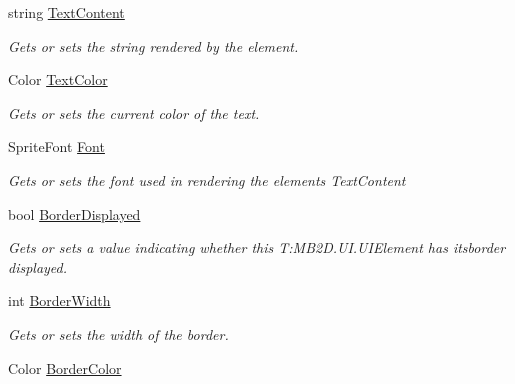 \begin{DoxyCompactItemize}
string \hyperlink{class_m_b2_d_1_1_u_i_1_1_u_i_element_abddab0c939c89a0be403b577d4428309}{Text\+Content}
\begin{DoxyCompactList}\small\item\em Gets or sets the string rendered by the element. \end{DoxyCompactList}\item 
Color \hyperlink{class_m_b2_d_1_1_u_i_1_1_u_i_element_aaf5bdcd4524ae5e93f1c40431d7d6c90}{Text\+Color}
\begin{DoxyCompactList}\small\item\em Gets or sets the current color of the text. \end{DoxyCompactList}\item 
Sprite\+Font \hyperlink{class_m_b2_d_1_1_u_i_1_1_u_i_element_a4c6bdbe83ece72ab6434c439371a0a39}{Font}
\begin{DoxyCompactList}\small\item\em Gets or sets the font used in rendering the elements Text\+Content \end{DoxyCompactList}\item 
bool \hyperlink{class_m_b2_d_1_1_u_i_1_1_u_i_element_a27fdfa5d734c96e8249bb7955d2d069c}{Border\+Displayed}
\begin{DoxyCompactList}\small\item\em Gets or sets a value indicating whether this T\+:\+M\+B2\+D.\+U\+I.\+U\+I\+Element has itsborder displayed. \end{DoxyCompactList}\item 
int \hyperlink{class_m_b2_d_1_1_u_i_1_1_u_i_element_ad20e0ef79012021b00d67fad2b013f94}{Border\+Width}
\begin{DoxyCompactList}\small\item\em Gets or sets the width of the border. \end{DoxyCompactList}\item 
Color \hyperlink{class_m_b2_d_1_1_u_i_1_1_u_i_element_a7e243b6b0b62b303751ce9d0425fbf1f}{Border\+Color}

\end{DoxyCompactItemize}
